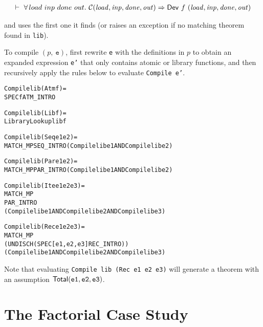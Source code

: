 \documentclass{llncs}
\begin{document}

\[
\begin{array}{l}
\vdash\ \forall \hspace*{0.5mm} load~inp~done~out.~{\cal C}(\mathit{load,inp,done,out}) \Rightarrow \mathsf{Dev}~f~(\mathit{load,inp,done,out})
\end{array}
\]


\noindent and uses the first one it finds (or raises an exception if no matching theorem found in \texttt{lib}).


To compile $(p,~\texttt{e})$, first rewrite \texttt{e} with the
definitions in $p$ to obtain an expanded expression \texttt{e'} that
only contains atomic or library functions, and then recursively apply
the rules below to evaluate \texttt{Compile~e'}.


{\baselineskip10pt\begin{alltt}
  Compile lib (Atm f) = 
   SPEC f ATM_INTRO

  Compile lib (Lib f) = 
   LibraryLookup lib f

  Compile lib (Seq e1 e2) = 
   MATCH_MP SEQ_INTRO (Compile lib e1 AND Compile lib e2)

  Compile lib (Par e1 e2) = 
   MATCH_MP PAR_INTRO (Compile lib e1 AND Compile lib e2)

  Compile lib (Ite e1 e2 e3) = 
   MATCH_MP 
    PAR_INTRO 
    (Compile lib e1 AND Compile lib e2 AND Compile lib e3)

  Compile lib (Rec e1 e2 e3) = 
   MATCH_MP 
    (UNDISCH(SPEC [e1,e2,e3] REC_INTRO))
    (Compile lib e1 AND Compile lib e2 AND Compile lib e3)
\end{alltt}}


\noindent Note that evaluating \texttt{Compile lib (Rec e1 e2 e3)} 
will generate a theorem with an assumption
$\mathsf{Total}(\texttt{e1},\texttt{e2},\texttt{e3})$.


\section{The Factorial Case Study}
\label{secTheFactorialCaseStudy}
\end{document}
